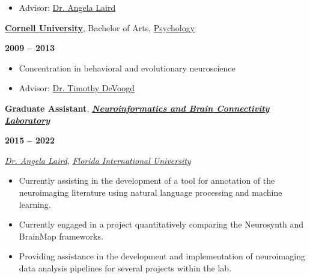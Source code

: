 \documentclass[10pt]{article}
\newcommand{\sectionstyle}{\LARGE \fontfamily{lmr}\selectfont}
\begin{document}
\begin{itemize}[noitemsep, nolistsep]
\item
  Advisor:
	\href{https://nbclab.github.io/team/angela-laird}{Dr. Angela Laird}
\end{itemize}

\bigskip

\begin{minipage}[t]{.7\linewidth}
\flushleft
\noindent
\href{https://cornell.edu}{\textbf{Cornell University}},
Bachelor of Arts,
\href{https://www.psych.cornell.edu}{Psychology}
\end{minipage}
\hfill
\begin{minipage}[t]{.3\linewidth}
\flushright
\noindent
\textsc{\textbf{2009 -- 2013}}
\end{minipage}

\begin{itemize}[noitemsep, nolistsep]
\item
  Concentration in behavioral and evolutionary neuroscience
\item
  Advisor:
	\href{http://www.psych.cornell.edu/people/faculty/devoogd-profile/}
	{Dr. Timothy DeVoogd}
\end{itemize}

\bigskip

\begin{center}\sectionstyle{EXPERIENCE}\end{center}

\begin{minipage}[t]{.8\linewidth}
\flushleft
\noindent
\textbf{Graduate Assistant},
\href{https://nbclab.github.io}
{\emph{\textbf{Neuroinformatics and Brain Connectivity Laboratory}}}
\end{minipage}
\hfill
\begin{minipage}[t]{.2\linewidth}
\flushright
\noindent
\textsc{\textbf{2015 -- 2022}}
\end{minipage}

\href{https://nbclab.github.io/team/laird-angela}{\emph{Dr. Angela Laird}},
\href{http://www.fiu.edu}{\emph{Florida International University}}

\begin{itemize}[noitemsep, nolistsep]
\item
  Currently assisting in the development of a tool for annotation of the
  neuroimaging literature using natural language processing and machine
  learning.
\item
  Currently engaged in a project quantitatively comparing the Neurosynth
  and BrainMap frameworks.
\item
  Providing assistance in the development and implementation of
  neuroimaging data analysis pipelines for several projects within the
  lab.
\end{itemize}
\end{document}
